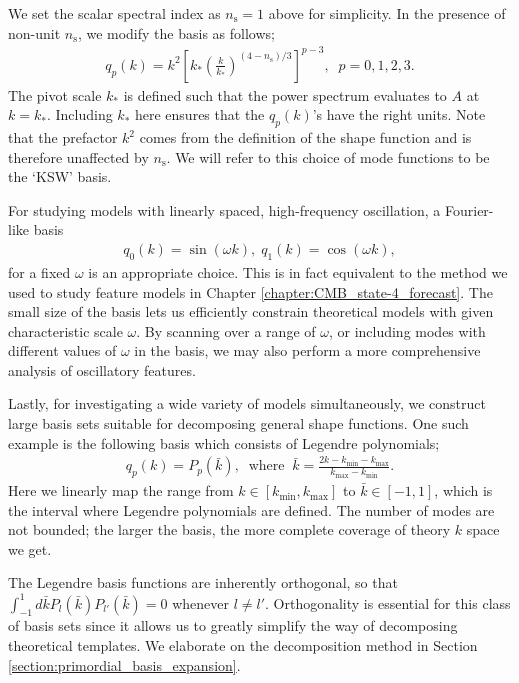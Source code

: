 We set the scalar spectral index as $n_\text{s} = 1$ above for simplicity. In the presence of non-unit $n_\text{s}$, we modify the basis as follows;
\begin{align}
	q_p(k) = k^2 \left[ k_* \left( \frac{k}{k_*} \right)^{(4-n_\text{s})/3} \right]^{p-3}, \;\; p=0,1,2,3. \label{eqn:KSW_basis}
\end{align}
The pivot scale $k_*$ is defined such that the power spectrum evaluates to $A$ at $k=k_*$. Including $k_*$ here ensures that the $q_p(k)$'s have the right units. Note that the prefactor $k^2$ comes from the definition of the shape function and is therefore unaffected by $n_\text{s}$. We will refer to this choice of mode functions to be the `KSW' basis.

For studying models with linearly spaced, high-frequency oscillation, a Fourier-like basis
\begin{align}
	q_0(k) = \sin (\omega k), \; q_1(k) = \cos (\omega k), \label{eqn:Fourier_basis}
\end{align}
for a fixed $\omega$ is an appropriate choice. This is in fact equivalent to the method we used to study feature models in Chapter \ref{chapter:CMB_state-4_forecast}. The small size of the basis lets us efficiently constrain theoretical models with given characteristic scale $\omega$. By scanning over a range of $\omega$, or including modes with different values of $\omega$ in the basis, we may also perform a more comprehensive analysis of oscillatory features.

Lastly, for investigating a wide variety of models simultaneously, we construct large basis sets suitable for decomposing general shape functions. One such example is the following basis which consists of Legendre polynomials;
\begin{align}
	q_p(k) = P_p(\bar{k}), \;\;\text{where}\;\; \bar{k} = \frac{2k-k_\text{min}-k_\text{max}}{k_\text{max}-k_\text{min}}.  \label{eqn:Legendre_basis_no_inv_k}
\end{align}
Here we linearly map the range from $k \in [k_\text{min},k_\text{max}]$ to $\bar{k} \in [-1,1]$, which is the interval where Legendre polynomials are defined. The number of modes are not bounded; the larger the basis, the more complete coverage of theory $k$ space we get.

The Legendre basis functions are inherently orthogonal, so that $\int_{-1}^{1} d\bar{k} P_{l}(\bar{k}) P_{l'}(\bar{k}) = 0$ whenever $l \neq l'$. Orthogonality is essential for this class of basis sets since it allows us to greatly simplify the way of decomposing theoretical templates. We elaborate on the decomposition method in Section \ref{section:primordial_basis_expansion}. 

